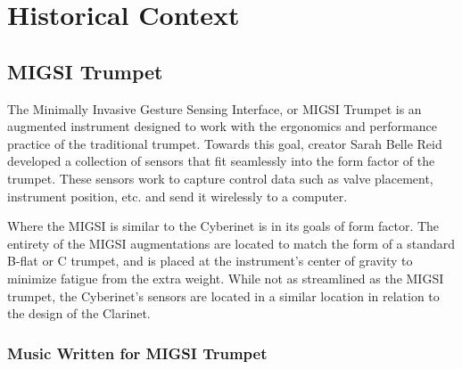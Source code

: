 

\chapter{Historical Context}

\section{MIGSI Trumpet}
The Minimally Invasive Gesture Sensing Interface, or MIGSI Trumpet is an augmented instrument designed to work with the ergonomics and performance practice of the traditional trumpet\cite{reid2016}. Towards this goal, creator Sarah Belle Reid developed a collection of sensors that fit seamlessly into the form factor of the trumpet. These sensors work to capture control data such as valve placement, instrument position, etc. and send it wirelessly to a computer.

Where the MIGSI is similar to the Cyberinet is in its goals of form factor. The entirety of the MIGSI augmentations are located to match the form of a standard B-flat or C trumpet, and is placed at the instrument's center of gravity to minimize fatigue from the extra weight. While not as streamlined as the MIGSI trumpet, the Cyberinet's sensors are located in a similar location in relation to the design of the Clarinet.


\subsection{Music Written for MIGSI Trumpet}

